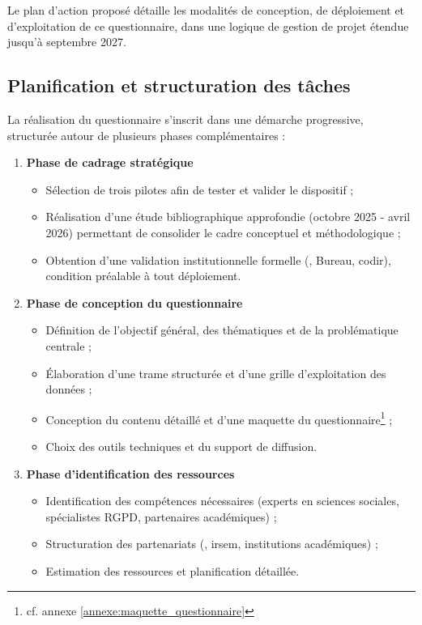 Le plan d'action proposé détaille les modalités de conception, de déploiement et d'exploitation de ce questionnaire, dans une logique de gestion de projet étendue jusqu'à septembre 2027.

\subsection{Planification et structuration des tâches}

La réalisation du questionnaire s'inscrit dans une démarche progressive, structurée autour de plusieurs phases complémentaires :

\begin{enumerate}
    \item \textbf{Phase de cadrage stratégique}
    \begin{itemize}
        \item Sélection de trois \AssociationsRegionalesIHEDN{} pilotes afin de tester et valider le dispositif ;
        \item Réalisation d'une étude bibliographique approfondie (octobre 2025 - avril 2026) permettant de consolider le cadre conceptuel et méthodologique ;
        \item Obtention d'une validation institutionnelle formelle (\UnionIHEDN, Bureau, \acrshort{codir}), condition préalable à tout déploiement.
    \end{itemize}

    \item \textbf{Phase de conception du questionnaire}
    \begin{itemize}
        \item Définition de l'objectif général, des thématiques et de la problématique centrale ;
        \item Élaboration d'une trame structurée et d'une grille d'exploitation des données ;
        \item Conception du contenu détaillé et d'une maquette du questionnaire\footnote{cf. annexe \ref{annexe:maquette_questionnaire}} ;
        \item Choix des outils techniques et du support de diffusion.
    \end{itemize}

    \item \textbf{Phase d'identification des ressources}
    \begin{itemize}
        \item Identification des compétences nécessaires (experts en sciences sociales, spécialistes RGPD, partenaires académiques) ;
        \item Structuration des partenariats (\UnionIHEDN, \gls{irsem}, institutions académiques) ;
        \item Estimation des ressources et planification détaillée.
    \end{itemize}


\end{enumerate}
